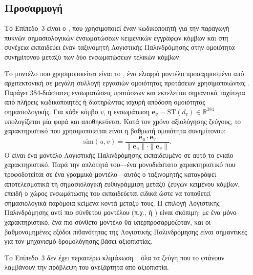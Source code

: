 \subsection{Προσαρμογή }
\label{subsec:sentence-transformer}

Το Επίπεδο~3 είναι ο \texttt{}, που χρησιμοποιεί έναν κωδικοποιητή
 για την παραγωγή πυκνών σημασιολογικών ενσωματώσεων
κειμενικών εγγράφων κόμβων και στη συνέχεια εκπαιδεύει έναν ταξινομητή Λογιστικής
Παλινδρόμησης στην ομοιότητα συνημίτονου μεταξύ των δύο ενσωματώσεων τελικών κόμβων.

Το μοντέλο  που χρησιμοποιείται είναι το
\texttt{}, ένα ελαφρύ μοντέλο προσαρμοσμένο από αρχιτεκτονική
 σε μεγάλη συλλογή εργασιών ομοιότητας προτάσεων χρησιμοποιώντας
.
Παράγει 384-διάστατες ενσωματώσεις προτάσεων και εκτελείται
σημαντικά ταχύτερα από πλήρεις κωδικοποιητές  ή  διατηρώντας
ισχυρή απόδοση ομοιότητας σημασιολογικής.
Για κάθε κόμβο $v$, η ενσωμάτωση
$\mathbf{e}_v = \mathrm{ST}(d_v) \in \mathbb{R}^{384}$ υπολογίζεται μία φορά και
αποθηκεύεται.
Κατά τον χρόνο αξιολόγησης ζεύγους, το χαρακτηριστικό που
χρησιμοποιείται είναι η βαθμωτή ομοιότητα συνημίτονου:
\begin{equation}
    \mathrm{sim}(u, v) = \frac{\mathbf{e}_u \cdot \mathbf{e}_v}
    {\|\mathbf{e}_u\| \cdot \|\mathbf{e}_v\|}.
    \label{eq:cosine-sim}
\end{equation}
Ο  είναι ένα μοντέλο Λογιστικής Παλινδρόμησης εκπαιδευμένο
σε αυτό το ενιαίο χαρακτηριστικό.
Παρά την απλότητά του---ένα μονοδιάστατο
χαρακτηριστικό που τροφοδοτείται σε ένα γραμμικό μοντέλο---αυτός ο ταξινομητής
καταγράφει αποτελεσματικά τη σημασιολογική ευθυγράμμιση μεταξύ ζευγών κειμένου
κόμβων, επειδή ο χώρος ενσωμάτωσης του  εκπαιδεύεται ειδικά
ώστε να τοποθετεί σημασιολογικά παρόμοια κείμενα κοντά μεταξύ τους.
Η επιλογή
Λογιστικής Παλινδρόμησης αντί πιο σύνθετου μοντέλου (π.χ.,  ή ) είναι
σκόπιμη: με ένα μόνο χαρακτηριστικό, ένα πιο σύνθετο μοντέλο θα υπερπροσαρμοζόταν,
και οι βαθμονομημένες εξόδοι πιθανότητας της Λογιστικής Παλινδρόμησης είναι σημαντικές
για τον μηχανισμό δρομολόγησης βάσει αξιοπιστίας.

Το Επίπεδο~3 δεν έχει περαιτέρω κλιμάκωση· όλα τα ζεύγη που το φτάνουν λαμβάνουν
την πρόβλεψη του  ανεξάρτητα από αξιοπιστία.


